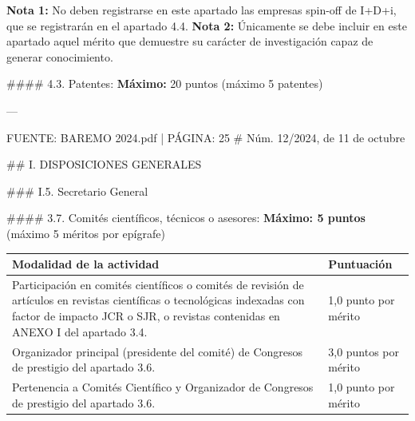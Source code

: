 \documentclass{article}
\begin{document}
\begin{itemize}
\begin{itemize}
\begin{scriptsize}
                  \textbf{Nota 1:} No deben registrarse en este apartado las empresas spin-off de I+D+i, que se registrarán en el apartado 4.4.
                  \textbf{Nota 2:} Únicamente se debe incluir en este apartado aquel mérito que demuestre su carácter de investigación capaz de generar conocimiento.

                  \#\#\#\# 4.3. Patentes:
                  \textbf{Máximo:} 20 puntos (máximo 5 patentes)

                  ---

                  FUENTE: BAREMO 2024.pdf | PÁGINA: 25
                  \# Núm. 12/2024, de 11 de octubre

                  \#\# I. DISPOSICIONES GENERALES

                  \#\#\# I.5. Secretario General

                  \#\#\#\# 3.7. Comités científicos, técnicos o asesores:
                  \textbf{Máximo: 5 puntos}
                  (máximo 5 méritos por epígrafe)

                  \vspace{0.4cm}
                  \begin{table}[h!]\centering\renewcommand{\arraystretch}{1.3}
                    \begin{tabular}{|p{}|p{}|}\hline
                      Modalidad de la actividad                                                                                                                                                                                    & Puntuación            \\\hline
                      Participación en comités científicos o comités de revisión de artículos en revistas científicas o tecnológicas indexadas con factor de impacto JCR o SJR, o revistas contenidas en ANEXO I del apartado 3.4. & 1,0 punto por mérito  \\\hline
                      Organizador principal (presidente del comité) de Congresos de prestigio del apartado 3.6.                                                                                                                    & 3,0 puntos por mérito \\\hline
                      Pertenencia a Comités Científico y Organizador de Congresos de prestigio del apartado 3.6.                                                                                                                   & 1,0 punto por mérito  \\\hline
                    \end{tabular}\end{table}
                  \vspace{0.4cm}


\end{scriptsize}
\end{itemize}
\end{itemize}
\end{document}
